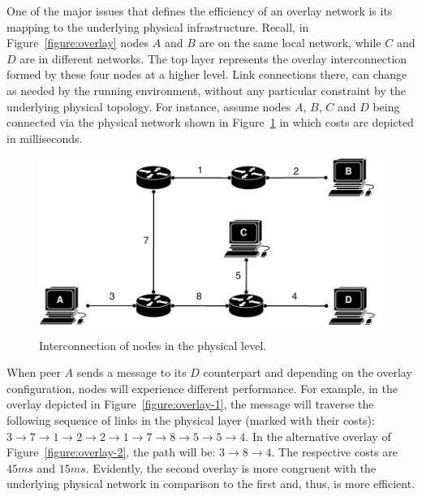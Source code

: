 One of the major issues that defines the efficiency of 
an overlay network is its mapping to 
the underlying physical infrastructure. 
Recall, in Figure~\ref{figure:overlay} nodes $A$ and $B$ are 
on the same local network, while $C$ and $D$ are in different networks. 
The top layer represents the overlay interconnection formed by 
these four nodes at a higher level. 
Link connections there, can change as needed by 
the running environment, without any
particular constraint by the underlying physical topology. 
For instance, assume nodes $A$, $B$, $C$ and $D$ being 
connected via the physical network shown in Figure~\ref{figure:phys}
in which costs are depicted in milliseconds. 
\begin{figure}[ht]
\centering
  \includegraphics[scale=0.4]{img/pdf/example-physical.pdf}
\caption{Interconnection of nodes in the physical level.}
\label{figure:phys}
\end{figure}
When peer $A$ sends a message to its $D$ counterpart
and depending on the overlay configuration, 
nodes will experience different performance.
For example, in the overlay depicted in
Figure~\ref{figure:overlay-1}, the
message will traverse the following sequence of links in the physical layer
(marked with their costs): $3 \rightarrow 7 \rightarrow 1 \rightarrow 2
\rightarrow 2 \rightarrow 1 \rightarrow 7 \rightarrow 8 \rightarrow 5
\rightarrow 5 \rightarrow 4$. In the alternative overlay of
Figure~\ref{figure:overlay-2}, the path will be: $3 \rightarrow 8 \rightarrow
4$. 
The respective costs are $45 ms$ and $15 ms$.
Evidently, the second overlay is more
congruent with the underlying physical network in comparison 
to the first and, thus, is more efficient.

